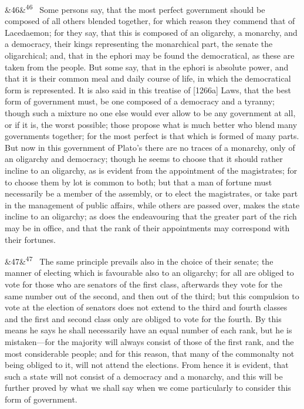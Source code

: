 \documentclass[12pt]{article}
\newcommand{\para}[1][]{\par\noindent\ifx&#1&\else\textsuperscript{\footnotesize #1}~\fi}
\begin{document}
\para[46] Some persons say, that the most perfect government should be composed of all others blended together, for which reason they commend that of Lacedaemon; for they say, that this is composed of an oligarchy, a monarchy, and a democracy, their kings representing the monarchical part, the senate the oligarchical; and, that in the ephori may be found the democratical, as these are taken from the people. But some say, that in the ephori is absolute power, and that it is their common meal and daily course of life, in which the democratical form is represented. It is also said in this treatise of [1266a] Laws, that the best form of government must, be one composed of a democracy and a tyranny; though such a mixture no one else would ever allow to be any government at all, or if it is, the worst possible; those propose what is much better who blend many governments together; for the most perfect is that which is formed of many parts. But now in this government of Plato's there are no traces of a monarchy, only of an oligarchy and democracy; though he seems to choose that it should rather incline to an oligarchy, as is evident from the appointment of the magistrates; for to choose them by lot is common to both; but that a man of fortune must necessarily be a member of the assembly, or to elect the magistrates, or take part in the management of public affairs, while others are passed over, makes the state incline to an oligarchy; as does the endeavouring that the greater part of the rich may be in office, and that the rank of their appointments may correspond with their fortunes.

\para[47] The same principle prevails also in the choice of their senate; the manner of electing which is favourable also to an oligarchy; for all are obliged to vote for those who are senators of the first class, afterwards they vote for the same number out of the second, and then out of the third; but this compulsion to vote at the election of senators does not extend to the third and fourth classes and the first and second class only are obliged to vote for the fourth. By this means he says he shall necessarily have an equal number of each rank, but he is mistaken---for the majority will always consist of those of the first rank, and the most considerable people; and for this reason, that many of the commonalty not being obliged to it, will not attend the elections. From hence it is evident, that such a state will not consist of a democracy and a monarchy, and this will be further proved by what we shall say when we come particularly to consider this form of government.
\end{document}
